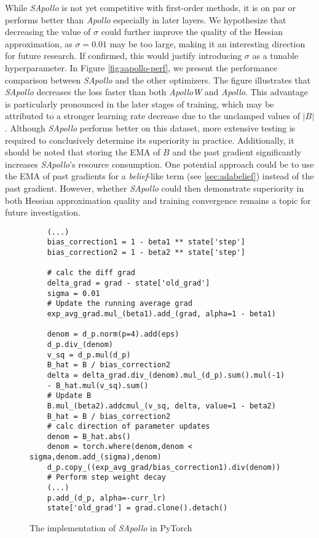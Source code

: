     While \emph{SApollo} is not yet competitive with first-order methods, it is on par or performs better than \emph{Apollo} especially in later layers.
    We hypothesize that decreasing the value of $\sigma$ could further improve the quality of the Hessian approximation, as $\sigma=0.01$ may be too large,
    making it an interesting direction for future research.
    If confirmed, this would justify introducing $\sigma$ as a tunable hyperparameter.
    In Figure \ref{fig:sapollo-perf}, we present the performance comparison between \emph{SApollo} and the other optimizers.
    The figure illustrates that \emph{SApollo} decreases the loss faster than both \emph{ApolloW} and \emph{Apollo}. This advantage is particularly pronounced in the later stages of training, which may be attributed to a stronger learning rate decrease due to the unclamped values of $\lvert B \rvert$.
    Although \emph{SApollo} performs better on this dataset, more extensive testing is required to conclusively determine its superiority in practice.
    Additionally, it should be noted that storing the EMA of $B$ and the past gradient significantly increases \emph{SApollo}'s resource consumption.
    One potential approach could be to use the EMA of past gradients for a \emph{belief}-like term (see \ref{sec:adabelief}) instead of the past gradient.
    However, whether \emph{SApollo} could then demonstrate superiority in both Hessian approximation quality and training convergence remains a topic for future investigation.


    \begin{figure}[H]
     \begin{verbatim}
    (...)
    bias_correction1 = 1 - beta1 ** state['step']
    bias_correction2 = 1 - beta2 ** state['step']

    # calc the diff grad
    delta_grad = grad - state['old_grad']
    sigma = 0.01
    # Update the running average grad
    exp_avg_grad.mul_(beta1).add_(grad, alpha=1 - beta1)

    denom = d_p.norm(p=4).add(eps)
    d_p.div_(denom)
    v_sq = d_p.mul(d_p)
    B_hat = B / bias_correction2
    delta = delta_grad.div_(denom).mul_(d_p).sum().mul(-1) 
    - B_hat.mul(v_sq).sum()
    # Update B
    B.mul_(beta2).addcmul_(v_sq, delta, value=1 - beta2)
    B_hat = B / bias_correction2
    # calc direction of parameter updates
    denom = B_hat.abs()
    denom = torch.where(denom,denom < sigma,denom.add_(sigma),denom)
    d_p.copy_((exp_avg_grad/bias_correction1).div(denom))
    # Perform step weight decay
    (...)
    p.add_(d_p, alpha=-curr_lr)
    state['old_grad'] = grad.clone().detach()
    \end{verbatim}
        \caption{The implementation of \emph{SApollo} in PyTorch}
        \label{fig:sapollo_imp}
    
        \end{figure}
    

